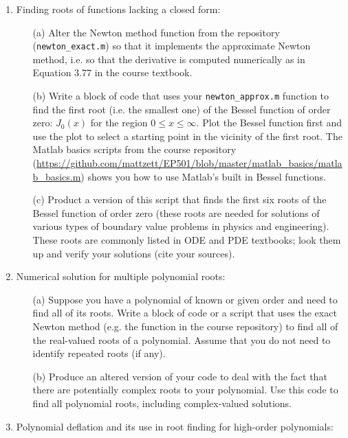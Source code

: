 \documentclass{article}
\begin{document}
\pagebreak

\begin{enumerate}
  \item Finding roots of functions lacking a closed form:  
  \begin{itemize}
    \item[(a)]  Alter the Newton method function from the repository (\texttt{newton\_exact.m}) so that it implements the approximate Newton method, i.e. so that the derivative is computed numerically as in Equation 3.77 in the course textbook.  
    \item[(b)]  Write a block of code that uses your \texttt{newton\_approx.m} function to find the first root (i.e. the smallest one) of the Bessel function of order zero: $J_0(x)$ for the region $0 \le x \le \infty$.  Plot the Bessel function first and use the plot to select a starting point in the vicinity of the first root.  The Matlab basics scripts from the course repository (\url{https://github.com/mattzett/EP501/blob/master/matlab_basics/matlab_basics.m}) shows you how to use Matlab's built in Bessel functions.   
    \item[(c)]  Product a version of this script that finds the first six roots of the Bessel function of order zero (these roots are needed for solutions of various types of boundary value problems in physics and engineering).  These roots are commonly listed in ODE and PDE textbooks; look them up and verify your solutions (cite your sources).  
  \end{itemize} 
  \item Numerical solution for multiple polynomial roots:
  \begin{itemize}
    \item[(a)]  Suppose you have a polynomial of known or given order and need to find all of its roots.  Write a block of code or a script that uses the exact Newton method (e.g. the function in the course repository) to find all of the real-valued roots of a polynomial.  Assume that you do not need to identify repeated roots (if any).
    \item[(b)]  Produce an altered version of your code to deal with the fact that there are potentially complex roots to your polynomial.  Use this code to find all polynomial roots, including complex-valued solutions.  
  \end{itemize}
  \item Polynomial deflation and its use in root finding for high-order polynomials:  
  \begin{itemize}

\end{itemize}
\end{enumerate}
\end{document}
